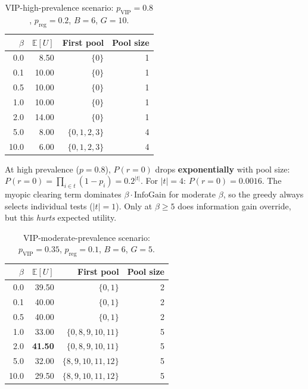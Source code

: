 \documentclass[11pt,a4paper]{article}
\newcommand{\E}{\mathbb{E}}
\begin{document}
\begin{table}[h]
\centering
\caption{VIP-high-prevalence scenario: $p_{\text{VIP}}=0.8$, $p_{\text{reg}}=0.2$, $B=6$, $G=10$.}
\label{tab:vip_high}
\begin{tabular}{rrrr}
\toprule
$\beta$ & $\E[U]$ & First pool & Pool size \\
\midrule
0.0 &  8.50 & $\{0\}$ & 1 \\
0.1 & 10.00 & $\{0\}$ & 1 \\
0.5 & 10.00 & $\{0\}$ & 1 \\
1.0 & 10.00 & $\{0\}$ & 1 \\
2.0 & 14.00 & $\{0\}$ & 1 \\
5.0 &  8.00 & $\{0,1,2,3\}$ & 4 \\
10.0 &  6.00 & $\{0,1,2,3\}$ & 4 \\
\bottomrule
\end{tabular}
\end{table}

\begin{finding}
At high prevalence ($p=0.8$), $P(r{=}0)$ drops \textbf{exponentially} with pool size:
$P(r{=}0) = \prod_{i \in t}(1-p_i) = 0.2^{|t|}$.
For $|t|=4$: $P(r{=}0) = 0.0016$.
The myopic clearing term dominates $\beta \cdot \text{InfoGain}$ for moderate $\beta$, so the greedy always selects individual tests ($|t|=1$).
Only at $\beta \geq 5$ does information gain override, but this \emph{hurts} expected utility.
\end{finding}

\begin{table}[h]
\centering
\caption{VIP-moderate-prevalence scenario: $p_{\text{VIP}}=0.35$, $p_{\text{reg}}=0.1$, $B=6$, $G=5$.}
\label{tab:vip_moderate}
\begin{tabular}{rrrr}
\toprule
$\beta$ & $\E[U]$ & First pool & Pool size \\
\midrule
0.0 & 39.50 & $\{0,1\}$ & 2 \\
0.1 & 40.00 & $\{0,1\}$ & 2 \\
0.5 & 40.00 & $\{0,1\}$ & 2 \\
1.0 & 33.00 & $\{0,8,9,10,11\}$ & 5 \\
2.0 & \textbf{41.50} & $\{0,8,9,10,11\}$ & 5 \\
5.0 & 32.00 & $\{8,9,10,11,12\}$ & 5 \\
10.0 & 29.50 & $\{8,9,10,11,12\}$ & 5 \\
\bottomrule
\end{tabular}
\end{table}
\end{document}
